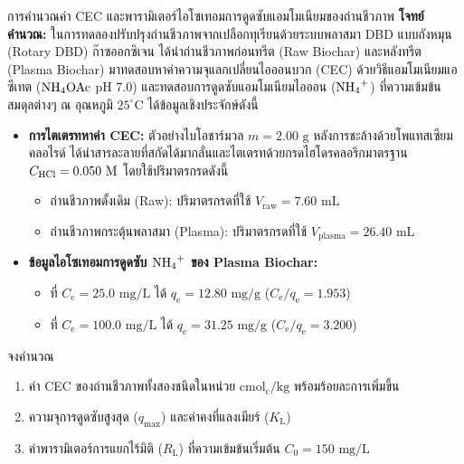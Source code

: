 \begin{examplebox}{การคำนวณค่า CEC และพารามิเตอร์ไอโซเทอมการดูดซับแอมโมเนียมของถ่านชีวภาพ}
\textbf{โจทย์คำนวณ:} ในการทดลองปรับปรุงถ่านชีวภาพจากเปลือกทุเรียนด้วยระบบพลาสมา DBD แบบถังหมุน (Rotary DBD) ก๊าซออกซิเจน ได้นำถ่านชีวภาพก่อนทรีต (Raw Biochar) และหลังทรีต (Plasma Biochar) มาทดสอบหาค่าความจุแลกเปลี่ยนไอออนบวก (CEC) ด้วยวิธีแอมโมเนียมแอซีเทต ($\ce{NH4OAc}$ pH 7.0) และทดสอบการดูดซับแอมโมเนียมไอออน ($\ce{NH4+}$) ที่ความเข้มข้นสมดุลต่างๆ ณ อุณหภูมิ $25^\circ\text{C}$ ได้ข้อมูลเชิงประจักษ์ดังนี้
\begin{itemize}
    \item \textbf{การไตเตรทหาค่า CEC:} ตัวอย่างไบโอชาร์มวล $m = 2.00 \text{ g}$ หลังการชะล้างด้วยโพแทสเซียมคลอไรด์ ได้นำสารละลายที่สกัดได้มากลั่นและไตเตรทด้วยกรดไฮโดรคลอริกมาตรฐาน $C_{\ce{HCl}} = 0.050 \text{ M}$ โดยใช้ปริมาตรกรดดังนี้
    \begin{itemize}
        \item ถ่านชีวภาพดั้งเดิม (Raw): ปริมาตรกรดที่ใช้ $V_{\text{raw}} = 7.60 \text{ mL}$
        \item ถ่านชีวภาพกระตุ้นพลาสมา (Plasma): ปริมาตรกรดที่ใช้ $V_{\text{plasma}} = 26.40 \text{ mL}$
    \end{itemize}
    \item \textbf{ข้อมูลไอโซเทอมการดูดซับ $\ce{NH4+}$ ของ Plasma Biochar:}
    \begin{itemize}
        \item ที่ $C_{\text{e}} = 25.0 \text{ mg/L}$ ได้ $q_{\text{e}} = 12.80 \text{ mg/g}$ ($C_{\text{e}}/q_{\text{e}} = 1.953$)
        \item ที่ $C_{\text{e}} = 100.0 \text{ mg/L}$ ได้ $q_{\text{e}} = 31.25 \text{ mg/g}$ ($C_{\text{e}}/q_{\text{e}} = 3.200$)
    \end{itemize}
\end{itemize}
จงคำนวณ
\begin{enumerate}
    \item ค่า CEC ของถ่านชีวภาพทั้งสองชนิดในหน่วย $\text{cmol}_{\text{c}}/\text{kg}$ พร้อมร้อยละการเพิ่มขึ้น
    \item ความจุการดูดซับสูงสุด ($q_{\text{max}}$) และค่าคงที่แลงเมียร์ ($K_{\text{L}}$)
    \item ค่าพารามิเตอร์การแยกไร้มิติ ($R_{\text{L}}$) ที่ความเข้มข้นเริ่มต้น $C_0 = 150 \text{ mg/L}$
\end{enumerate}


\end{examplebox}
